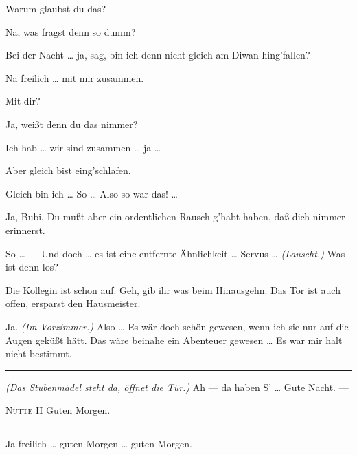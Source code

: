 \documentclass[
	final,
	a4paper,
	ngerman,
	mpinclude = true, %
	twoside = true,
	open = right,
	cleardoublepage = plain,
	DIV = 13,
	BCOR = 1cm,
	titlepage = firstiscover,
	]{scrbook}
\newcommand{\direction}[1]{\textit{(#1)}}
\newenvironment{deletion}{%
		\vspace{0.25\baselineskip}
		\hrule
		\vspace{0.25\baselineskip}
		\color{darkgray}
	}{
		\color{black}
		\vspace{0.25\baselineskip}
		\hrule 
		\vspace{0.25\baselineskip}
	}
\newcommand{\thecharacter}[1]{\textup{\textsc{#1}}\xspace}
\newcommand{\thenutte}{\thecharacter{Leocadia}}
\newcommand{\theentrepeneurin}{\thecharacter{Katerina Albrecht}}
\newcommand{\character}[1]{\item[#1:]}
\newcommand{\nutte}{\character{\thenutte}}
\newcommand{\entrepeneurin}{\character{\theentrepeneurin}}
\begin{document}
\begin{play}
	\entrepeneurin
	Warum glaubst du das?

	\nutte
	Na, was fragst denn so dumm?

	\entrepeneurin
	Bei der Nacht \ldots{} ja, sag, bin ich denn nicht gleich am Diwan hing'fallen?

	\nutte
	Na freilich \ldots{} mit mir zusammen.

	\entrepeneurin
	Mit dir?

	\nutte
	Ja, weißt denn du das nimmer?

	\entrepeneurin
	Ich hab \ldots{} wir sind zusammen \ldots{} ja \ldots{}

	\nutte
	Aber gleich bist eing'schlafen.

	\entrepeneurin
	Gleich bin ich \ldots{} So \ldots{} Also so war das! \ldots{}

	\nutte
	Ja, Bubi. Du mußt aber ein ordentlichen Rausch g'habt haben, daß dich nimmer erinnerst.

	\entrepeneurin
	So \ldots{} --- Und doch \ldots{} es ist eine entfernte Ähnlichkeit \ldots{} Servus \ldots{} \direction{Lauscht.} Was ist denn los?

	\nutte
	Die Kollegin ist schon auf. Geh, gib ihr was beim Hinausgehn. Das Tor ist auch offen, ersparst den Hausmeister.

	\entrepeneurin
	Ja. \direction{Im Vorzimmer.} Also \ldots{} Es wär doch schön gewesen, wenn ich sie nur auf die Augen geküßt hätt. Das wäre beinahe ein Abenteuer gewesen \ldots{} Es war mir halt nicht bestimmt.
	\begin{deletion}
		\direction{Das Stubenmädel steht da, öffnet die Tür.} Ah --- da haben S' \ldots{} Gute Nacht. ---

	\textsc{Nutte II}
	Guten Morgen.
	\end{deletion}

	\entrepeneurin
	Ja freilich \ldots{} guten Morgen \ldots{} guten Morgen.

\end{play}
\end{document}
